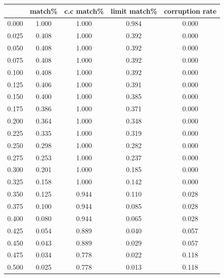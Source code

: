 \documentclass{article}
\begin{document}
\begin{table}[H]
  \centering
  \begin{tabular}{
  >{\columncolor[HTML]{FFE599}}c 
  >{\columncolor[HTML]{B6D7A8}}c 
  >{\columncolor[HTML]{9FC5E8}}c 
  >{\columncolor[HTML]{F9CB9C}}c 
  >{\columncolor[HTML]{D9D2E9}}c }
  \cline{1-1}
  \multicolumn{1}{|c|}{\cellcolor[HTML]{F1C232}threshold} &
    \cellcolor[HTML]{6AA84F}match\% &
    \cellcolor[HTML]{3C78D8}c.c match\% &
    \cellcolor[HTML]{E69138}limit match\% &
    \cellcolor[HTML]{8E7CC3}corruption rate \\ \cline{1-1}
  0.000 & 1.000 & 1.000 & 0.984 & 0.000 \\
  0.025 & 0.408 & 1.000 & 0.392 & 0.000 \\
  0.050 & 0.408 & 1.000 & 0.392 & 0.000 \\
  0.075 & 0.408 & 1.000 & 0.392 & 0.000 \\
  0.100 & 0.408 & 1.000 & 0.392 & 0.000 \\
  0.125 & 0.406 & 1.000 & 0.391 & 0.000 \\
  0.150 & 0.400 & 1.000 & 0.385 & 0.000 \\
  0.175 & 0.386 & 1.000 & 0.371 & 0.000 \\
  0.200 & 0.364 & 1.000 & 0.348 & 0.000 \\
  0.225 & 0.335 & 1.000 & 0.319 & 0.000 \\
  0.250 & 0.298 & 1.000 & 0.282 & 0.000 \\
  0.275 & 0.253 & 1.000 & 0.237 & 0.000 \\
  0.300 & 0.201 & 1.000 & 0.185 & 0.000 \\
  0.325 & 0.158 & 1.000 & 0.142 & 0.000 \\
  0.350 & 0.125 & 0.944 & 0.110 & 0.028 \\
  0.375 & 0.100 & 0.944 & 0.085 & 0.028 \\
  0.400 & 0.080 & 0.944 & 0.065 & 0.028 \\
  \cellcolor[HTML]{FF0000}0.425 &
    \cellcolor[HTML]{FF0000}0.054 &
    \cellcolor[HTML]{FF0000}0.889 &
    \cellcolor[HTML]{FF0000}0.040 &
    \cellcolor[HTML]{FF0000}0.057 \\
  0.450 & 0.043 & 0.889 & 0.029 & 0.057 \\
  0.475 & 0.034 & 0.778 & 0.022 & 0.118 \\
  0.500 & 0.025 & 0.778 & 0.013 & 0.118 \\

\end{tabular}
\end{table}
\end{document}
